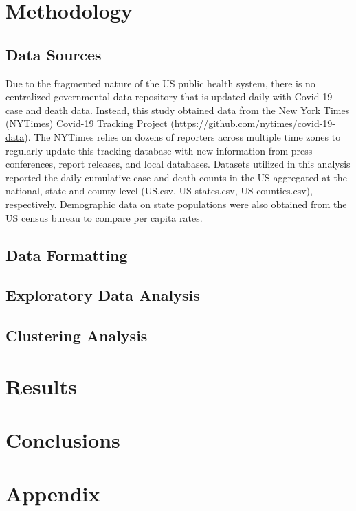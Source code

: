 \documentclass[11pt,]{article}
\begin{document}
\hypertarget{methodology}{%
\section{Methodology}\label{methodology}}

\hypertarget{data-sources}{%
\subsection{Data Sources}\label{data-sources}}

Due to the fragmented nature of the US public health system, there is no
centralized governmental data repository that is updated daily with
Covid-19 case and death data. Instead, this study obtained data from the
New York Times (NYTimes) Covid-19 Tracking Project
(\url{https://github.com/nytimes/covid-19-data}). The NYTimes relies on
dozens of reporters across multiple time zones to regularly update this
tracking database with new information from press conferences, report
releases, and local databases. Datasets utilized in this analysis
reported the daily cumulative case and death counts in the US aggregated
at the national, state and county level (US.csv, US-states.csv,
US-counties.csv), respectively. Demographic data on state populations
were also obtained from the US census bureau to compare per capita
rates.

\hypertarget{data-formatting}{%
\subsection{Data Formatting}\label{data-formatting}}

\hypertarget{exploratory-data-analysis}{%
\subsection{Exploratory Data Analysis}\label{exploratory-data-analysis}}

\hypertarget{clustering-analysis}{%
\subsection{Clustering Analysis}\label{clustering-analysis}}

\hypertarget{results}{%
\section{Results}\label{results}}

\hypertarget{conclusions}{%
\section{Conclusions}\label{conclusions}}

\hypertarget{appendix}{%
\section{Appendix}\label{appendix}}





\newpage
\singlespacing 

\end{document}
